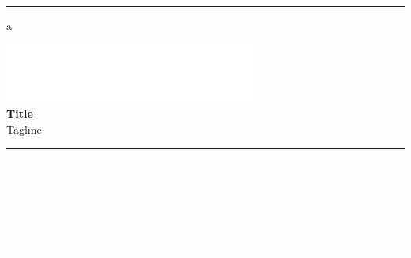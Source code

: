 \documentclass{report}
\begin{document}

\begin{titlepage}
    \pagecolor{WITGrey}\afterpage{\nopagecolor}
    \thispagestyle{empty}
    \hspace*{-.605cm}
    \begin{minipage}[t][.99\paperheight][b]{1.33 in}
        \textcolor{WITYellow}{\rule{1.331 in}{2\paperheight}}
    \end{minipage}\begin{minipage}{.53 in}
    \textcolor{WITGrey}{a}
    \end{minipage}\begin{minipage}[t]{6.2 in}
        \vspace*{.49 in}
        \hspace{\fill}  \includegraphics*[width=3.25in]{WIT-Full-Wordmark_White_PNG.png}\\[35ex]
        \fontsize{45pt}{12pt}\selectfont
        \textcolor{WITYellow}{\bfseries{Title}}\\[1.25ex]
        \fontsize{25pt}{12pt}\selectfont
        \textcolor{WITYellow}{Tagline}\\[.75ex]
        \textcolor{WITYellow}{\rule{\textwidth}{.15cm}}\\[2ex]
        \textcolor{white}{}\\[1.5ex]
        \fontsize{15pt}{12pt}\selectfont
        \textcolor{white}{Instructed by Supervisor}\\[.5ex]
        \textcolor{white}{Department of Department}\\[20ex]
        \fontsize{16pt}{12pt}\selectfont
        \textcolor{white}{}\\[3ex]
        \fontsize{11pt}{12pt}\selectfont
        \textcolor{white}{Project purpose blurb}
\end{minipage}\begin{minipage}{0.41 in}

\end{minipage}
\end{titlepage}

\restoregeometry
\end{document}
